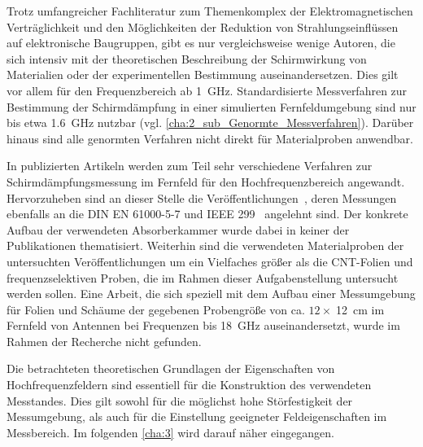 
Trotz umfangreicher Fachliteratur zum Themenkomplex der Elektromagnetischen Verträglichkeit und den Möglichkeiten der Reduktion von Strahlungseinflüssen auf elektronische Baugruppen, gibt es nur vergleichsweise wenige Autoren, die sich intensiv mit der theoretischen Beschreibung der Schirmwirkung von Materialien oder der experimentellen Bestimmung auseinandersetzen. Dies gilt vor allem für den Frequenzbereich ab \SI{1}{\giga\hertz}. Standardisierte Messverfahren zur Bestimmung der Schirmdämpfung in einer simulierten Fernfeldumgebung sind nur bis etwa \SI{1,6}{\giga\hertz} nutzbar (vgl. \Abschnitt\ref{cha:2_sub_Genormte_Messverfahren}). Darüber hinaus sind alle genormten Verfahren nicht direkt für Materialproben anwendbar. 
\par
\vspace{\linespace}
In publizierten Artikeln werden zum Teil sehr verschiedene Verfahren zur Schirmdämpfungsmessung im Fernfeld für den Hochfrequenzbereich angewandt. Hervorzuheben sind an dieser Stelle die Veröffentlichungen~\cite{Measurement_Shielding_Textile_Materials_Free_Space_Transmission, Predicted_and_Measured_EMI_Effectiveness_Metallic_Mesh_on_Window}, deren Messungen ebenfalls an die DIN EN 61000-5-7 und IEEE 299~\cite{DIN_EN_61000-5-7, IEEE_299} angelehnt sind. Der konkrete Aufbau der verwendeten Absorberkammer wurde dabei in keiner der Publikationen thematisiert. Weiterhin sind die verwendeten Materialproben der untersuchten Veröffentlichungen um ein Vielfaches größer als die CNT-Folien und frequenzselektiven Proben, die im Rahmen dieser Aufgabenstellung untersucht werden sollen. Eine Arbeit, die sich speziell mit dem Aufbau einer Messumgebung für Folien und Schäume der gegebenen Probengröße von ca. $12 \times \;$\SI{12}{\centi\meter} im Fernfeld von Antennen bei Frequenzen bis \SI{18}{\giga\hertz} auseinandersetzt, wurde im Rahmen der Recherche nicht gefunden.
\par
\vspace{\linespace}
Die betrachteten theoretischen Grundlagen der Eigenschaften von Hochfrequenzfeldern sind essentiell für die Konstruktion des verwendeten Messtandes. Dies gilt sowohl für die möglichst hohe Störfestigkeit der Messumgebung, als auch für die Einstellung geeigneter Feldeigenschaften im Messbereich. Im folgenden \Kapitel\ref{cha:3} wird darauf näher eingegangen.






